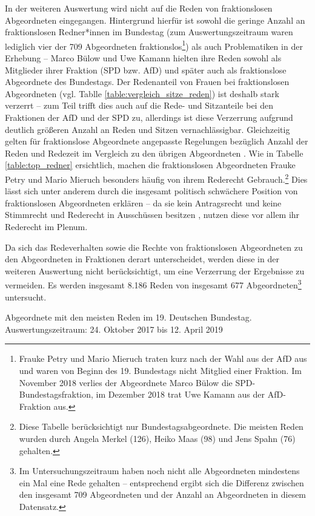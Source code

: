 \documentclass[12pt, 
    twoside=false, 
    bibliography=totoc, 
    numbers=endperiod, 
    headings=normal, 
    toc=chapterentrydotfill
    ]{scrbook}
\begin{document}
In der weiteren Auswertung wird nicht auf die Reden von fraktionslosen Abgeordneten eingegangen. Hintergrund hierfür ist sowohl die geringe Anzahl an fraktionslosen Redner*innen im Bundestag (zum Auswertungszeitraum waren lediglich vier der 709 Abgeordneten fraktionslos\footnote{Frauke Petry und Mario Mieruch traten kurz nach der Wahl aus der AfD aus und waren von Beginn des 19. Bundestags nicht Mitglied einer Fraktion. Im November 2018 verlies der Abgeordnete Marco Bülow die SPD-Bundestagsfraktion, im Dezember 2018 trat Uwe Kamann aus der AfD-Fraktion aus.}) als auch Problematiken in der Erhebung -- Marco Bülow und Uwe Kamann hielten ihre Reden sowohl als Mitglieder ihrer Fraktion (SPD bzw. AfD) und später auch als fraktionslose Abgeordnete des Bundestags. Der Redenanteil von Frauen bei fraktionslosen Abgeordneten (vgl. Tablle \ref{table:vergleich_sitze_reden}) ist deshalb stark verzerrt -- zum Teil trifft dies auch auf die Rede- und Sitzanteile bei den Fraktionen der AfD und der SPD zu, allerdings ist diese Verzerrung aufgrund deutlich größeren Anzahl an Reden und Sitzen vernachlässigbar.
Gleichzeitig gelten für fraktionslose Abgeordnete angepasste Regelungen bezüglich Anzahl der Reden und Redezeit im Vergleich zu den übrigen Abgeordneten \parencite[vgl.][583f.]{schreiner_2005}. Wie in Tabelle \ref{table:top_redner} ersichtlich, machen die fraktionslosen Abgeordneten Frauke Petry und Mario Mieruch besonders häufig von ihrem Rederecht Gebrauch.\footnote{Diese Tabelle berücksichtigt nur Bundestagsabgeordnete. Die meisten Reden wurden durch Angela Merkel (126), Heiko Maas (98) und Jens Spahn (76) gehalten.} Dies lässt sich unter anderem durch die insgesamt politisch schwächere Position von fraktionslosen Abgeordneten erklären \parencite[372]{morlok_2018} -- da sie kein Antragsrecht und keine Stimmrecht und Rederecht in Ausschüssen besitzen \parencite[vgl.][]{morlok_2018}, nutzen diese vor allem ihr Rederecht im Plenum.

Da sich das Redeverhalten sowie die Rechte von fraktionslosen Abgeordneten zu den Abgeordneten in Fraktionen derart unterscheidet, werden diese in der weiteren Auswertung nicht berücksichtigt, um eine Verzerrung der Ergebnisse zu vermeiden. Es werden insgesamt 8.186 Reden von insgesamt 677 Abgeordneten\footnote{Im Untersuchungszeitraum haben noch nicht alle Abgeordneten mindestens ein Mal eine Rede gehalten -- entsprechend ergibt sich die Differenz zwischen den insgesamt 709 Abgeordneten und der Anzahl an Abgeordneten in diesem Datensatz.} untersucht. 

\begin{table}[htb]
    \centering
    \caption[Abgeordnete mit den meisten Reden im 19. Deutschen Bundestag.]{Abgeordnete mit den meisten Reden im 19. Deutschen Bundestag. Auswertungszeitraum: 24. Oktober 2017 bis 12. April 2019}
    
    \label{table:top_redner}
\end{table}
\end{document}
